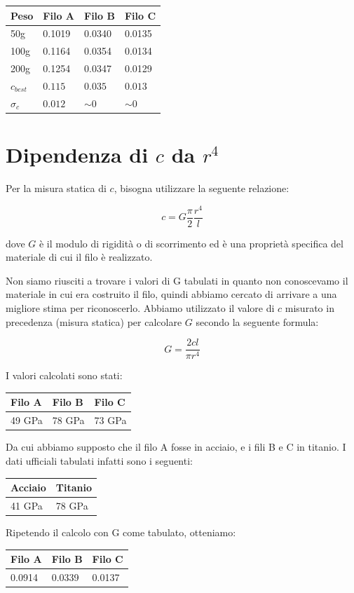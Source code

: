 \begin{center}
\begin{tabular}{l|lll}
Peso & Filo A & Filo B & Filo C \\
\midrule
50g & 0.1019 & 0.0340 & 0.0135 \\
100g & 0.1164 & 0.0354 & 0.0134 \\
200g & 0.1254 & 0.0347 & 0.0129 \\
\midrule
$c_{best}$ & $0.115$ & $0.035$& $0.013$ \\
$\sigma_{c}$ & $0.012$ & $\sim0$ & $\sim 0$ \\
\end{tabular}
\end{center}

\section{Dipendenza di $c$ da $r^4$}

Per la misura statica di $c$, bisogna utilizzare la seguente relazione:

$$ c = G \frac{\pi}{2}\frac{r^4}{l} $$

dove $G$ è il modulo di rigidità o di scorrimento ed è una proprietà specifica del materiale di cui il filo è realizzato.

Non siamo riusciti a trovare i valori di G tabulati in quanto non conoscevamo il materiale in cui era costruito il filo, quindi abbiamo cercato di arrivare a una migliore stima per riconoscerlo. Abbiamo utilizzato il valore di $c$ misurato in precedenza (misura statica) per calcolare $G$ secondo la seguente formula:

$$ G = \frac{2cl}{\pi r^4} $$

I valori calcolati sono stati:
\begin{center}
\begin{tabular}{lll}
Filo A & Filo B & Filo C \\
\midrule
49 GPa & 78 GPa & 73 GPa \\
\end{tabular}
\end{center}

Da cui abbiamo supposto che il filo A fosse in acciaio, e i fili B e C in titanio.
I dati ufficiali tabulati infatti sono i seguenti:
\begin{center}
\begin{tabular}{ll}
Acciaio & Titanio \\
\midrule
41 GPa & 78 GPa \\
\end{tabular}
\end{center}
Ripetendo il calcolo con G come tabulato, otteniamo:
\begin{center}
\begin{tabular}{lll}
Filo A & Filo B & Filo C \\
\midrule
0.0914 & 0.0339 & 0.0137 \\
\end{tabular}
\end{center}
